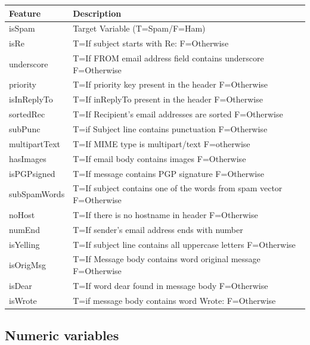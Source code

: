 \documentclass[
]{article}
\begin{document}
\begin{table}[H]
\centering
\begin{tabular}[t]{l>{\raggedright\arraybackslash}p{30em}}
\toprule
Feature & Description\\
\midrule
isSpam & Target Variable (T=Spam/F=Ham)\\
isRe & T=If subject starts with Re: F=Otherwise\\
underscore & T=If FROM email address field contains underscore F=Otherwise\\
priority & T=If priority key present in the header F=Otherwise\\
isInReplyTo & T=If inReplyTo present in the header F=Otherwise\\
\addlinespace
sortedRec & T=If Recipient's email addresses are sorted F=Otherwise\\
subPunc & T=if Subject line contains punctuation F=Otherwise\\
multipartText & T=If MIME type is multipart/text F=otherwise\\
hasImages & T=If email body contains images F=Otherwise\\
isPGPsigned & T=If message contains PGP signature F=Otherwise\\
\addlinespace
subSpamWords & T=If subject contains one of the words from spam vector F=Otherwise\\
noHost & T=If there is no hostname in header F=Otherwise\\
numEnd & T=If sender's email address ends with number\\
isYelling & T=If subject line contains all uppercase letters F=Otherwise\\
isOrigMsg & T=If Message body contains word original message F=Otherwise\\
\addlinespace
isDear & T=If word dear found in message body F=Otherwise\\
isWrote & T=if message body contains word Wrote: F=Otherwise\\
\bottomrule
\end{tabular}
\end{table}

\hypertarget{numeric-variables}{%
\subsection{Numeric variables}\label{numeric-variables}}
\end{document}
